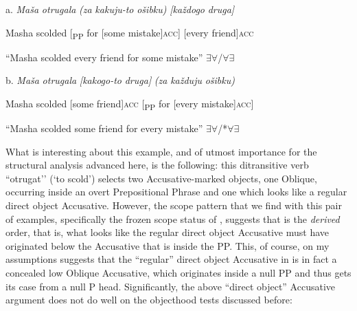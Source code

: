 \documentclass[output=paper,modfonts, nonflat]{langsci/langscibook}
\begin{document}
\begin{styleinnerExample}
\begin{styleinnerExample}
          a.  \textit{Maša}   \textit{otrugala}    \textit{(za}  \textit{kakuju-to} \textit{ošibku)}          \textit{[každogo} \textit{druga]}
\end{styleinnerExample}

\begin{styleinnerExample}
    Masha scolded [\textsubscript{PP} for [some       mistake]\textsc{acc}] [every    friend]\textsc{acc~}
\end{styleinnerExample}

\begin{styleinnerExample}
    “Masha scolded every friend for some mistake” ${\exists}{\forall}$/${\forall}{\exists}$\\\end{styleinnerExample}

\begin{styleinnerExample}
  b.  \textit{Maša}   \textit{otrugala} \textit{[kakogo-to} \textit{druga]}            \textit{(za}  \textit{každuju}  \textit{ošibku)}
\end{styleinnerExample}

\begin{styleinnerExample}
    Masha scolded  [some         friend]\textsc{acc} [\textsubscript{PP} for [every     mistake]\textsc{acc}]
\end{styleinnerExample}

\begin{styleinnerExample}
    “Masha scolded some friend for every mistake” ${\exists}{\forall}$/*${\forall}{\exists}$
\end{styleinnerExample}

What is interesting about this example, and of utmost importance for the structural analysis advanced here, is the following: this ditransitive verb “otrugat’’ (‘to scold’) selects two Accusative-marked objects, one Oblique, occurring inside an overt Prepositional Phrase and one which looks like a regular direct object Accusative. However, the scope pattern that we find with this pair of examples, specifically the frozen scope status of , suggests that  is the \textit{derived} order, that is, what looks like the regular direct object Accusative must have originated below the Accusative that is inside the PP. This, of course, on my assumptions suggests that the “regular” direct object Accusative in  is in fact a concealed low Oblique Accusative, which originates inside a null PP and thus gets its case from a null P head. Significantly, the above “direct object” Accusative argument does not do well on the objecthood tests discussed before:


\end{styleinnerExample}
\end{document}
